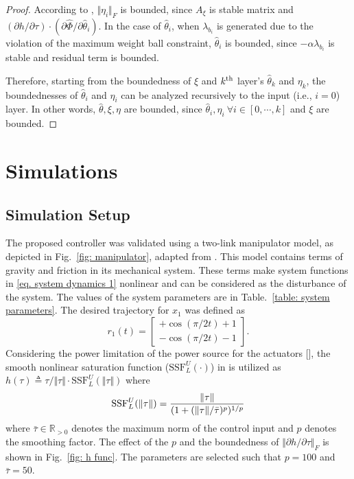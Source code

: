 \documentclass[lettersize,journal]{IEEEtran}
\begin{document}
\begin{proof}
According to \cite[Chap.~4 T.~1.9]{RN13}, $\Vert\eta_i\Vert_F$ is bounded, since $A_\xi$ is stable matrix and $(\partial h/\partial \tau) \cdot (\partial \hat\Phi/\partial\hat\theta_i)$.
In the case of $\hat\theta_i$, when $\lambda_{b_i}$ is generated due to the violation of the maximum weight ball constraint, $\hat\theta_i$ is bounded, since $-\alpha\lambda_{b_i}$ is stable and residual term is bounded.

Therefore, starting from the boundedness of $\xi$ and $k\textsuperscript{th}$ layer's $\hat\theta_k$ and $\eta_k$, the boundednesses of $\hat\theta_i$ and $\eta_i$ can be analyzed recursively to the input (i.e., $i=0$) layer. 
In other words, $\hat\theta,\xi,\eta$ are bounded, since $\hat\theta_i,\eta_i\ \forall i\in[0,\cdots,k]$ and $\xi$ are bounded.

\end{proof}

\section{Simulations}\label{sec:sim}

\subsection{Simulation Setup}

The proposed controller was validated using a two-link manipulator model, as depicted in Fig.~\ref{fig: manipulator}, adapted from \cite{RN32}.
This model contains terms of gravity and friction in its mechanical system.
These terms make system functions in \eqref{eq. system dynamics 1} nonlinear and can be considered as the disturbance of the system.
The values of the system parameters are in Table.~\ref{table: system parameters}.
The desired trajectory for $x_1$ was defined as
\begin{equation*}
    r_1(t) = 
    \begin{bmatrix}
        +\cos(\pi/2 t) + 1 \\
        -\cos(\pi/2 t) - 1 
    \end{bmatrix}.
\end{equation*}
\color{red}
Considering the power limitation of the power source for the actuators [], 
\color{black}
the smooth nonlinear saturation function ($\text{SSF}_L^U(\cdot)$) in \cite{RN28} is utilized as $h(\tau)\triangleq \tau/\Vert\tau\Vert \cdot \text{SSF}_L^U(\Vert\tau\Vert)$ where
\begin{equation}
    \text{SSF}_L^U(\Vert\tau\Vert) = {\Vert\tau\Vert\over (1+(\Vert\tau\Vert/\bar\tau)^p)^{1/p}}
    \label{eq. h func}
\end{equation}
where $\bar\tau\in\mathbb R_{>0}$ denotes the maximum norm of the control input and $p$ denotes the smoothing factor.
The effect of the $p$ and the boundedness of $\Vert\partial h/\partial \tau\Vert_F$ is shown in Fig.~\ref{fig: h func}.
The parameters are selected such that $p=100$ and $\bar\tau=50$.
\end{document}
